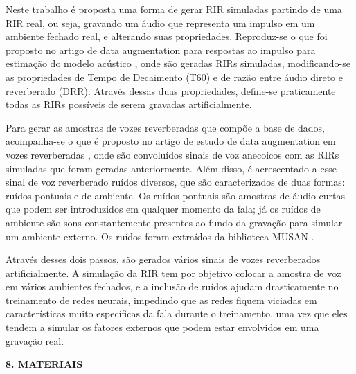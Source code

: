 \documentclass[a4paper,12pt,oneside,openany]{report}
\begin{document}
Neste trabalho é proposta uma forma de gerar RIR simuladas partindo de uma RIR real, ou seja, gravando um áudio que representa um impulso em um ambiente
fechado real, e alterando suas propriedades. Reproduz-se o que foi proposto no artigo de data augmentation para respostas ao impulso para
estimação do modelo acústico \cite{RIR_Data_Aug}, onde são geradas RIRs simuladas, modificando-se as propriedades de Tempo de Decaimento (T60) e de
razão entre áudio direto e reverberado (DRR). Através dessas duas propriedades, define-se praticamente todas as RIRs possíveis de serem gravadas
artificialmente.

Para gerar as amostras de vozes reverberadas que compõe a base de dados, acompanha-se o que é proposto no artigo de estudo de data
augmentation em vozes reverberadas \cite{Speech_Rec}, onde são convoluídos sinais de voz anecoicos com as RIRs simuladas que foram geradas anteriormente.
Além disso, é acrescentado a esse sinal de voz reverberado ruídos diversos, que são caracterizados de duas formas: ruídos pontuais e de ambiente.
Os ruídos pontuais são amostras de áudio curtas que podem ser introduzidos em qualquer momento da fala; já os ruídos de ambiente são sons constantemente
presentes ao fundo da gravação para simular um ambiente externo. Os ruídos foram extraídos da biblioteca MUSAN \cite{noiseLib}.

Através desses dois passos, são gerados vários sinais de vozes reverberados artificialmente. A simulação da RIR tem por objetivo colocar
a amostra de voz em vários ambientes fechados, e a inclusão de ruídos ajudam drasticamente no treinamento de redes neurais, impedindo que as redes fiquem
viciadas em características muito específicas da fala durante o treinamento, uma vez que eles tendem a simular os fatores
externos que podem estar envolvidos em uma gravação real.

\pagebreak
\textbf{8. MATERIAIS}
\end{document}
